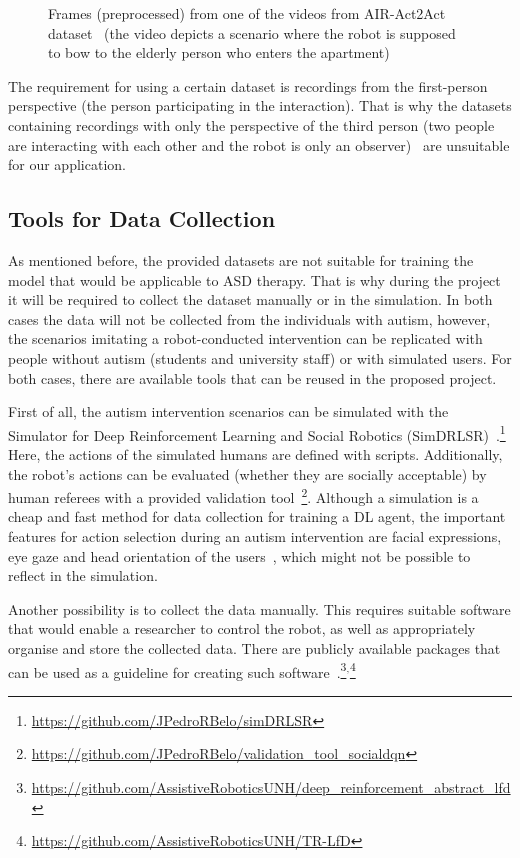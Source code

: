 \documentclass[thesis]{mas_proposal}
\begin{document}
\begin{figure}[htb!]
\begin{subfigure}[b]{0.22\textwidth}
		\subcaption{}%
		\label{subfig:right}
	\end{subfigure}
	\caption{Frames (preprocessed) from one of the videos from AIR-Act2Act dataset~\cite{Ko2021} (the video depicts a scenario where the robot is supposed to bow to the elderly person who enters the apartment)}
	\label{fig:hoora}
\end{figure}

The requirement for using a certain dataset is recordings from the first-person perspective (the person participating in the interaction). That is why the datasets containing recordings with only the perspective of the third person (two people are interacting with each other and the robot is only an observer)~\cite{Hu2013,UT-Interaction-Data,Gemeren2016,Yun2012} are unsuitable for our application.

\subsection{Tools for Data Collection}

As mentioned before, the provided datasets are not suitable for training the model that would be applicable to ASD therapy. That is why during the project it will be required to collect the dataset manually or in the simulation. In both cases the data will not be collected from the individuals with autism, however, the scenarios imitating a robot-conducted intervention can be replicated with people without autism (students and university staff) or with simulated users. For both cases, there are available tools that can be reused in the proposed project.

First of all, the autism intervention scenarios can be simulated with the Simulator for Deep Reinforcement Learning and Social Robotics (SimDRLSR)~\cite{Belo2021}.\footnote{\url{https://github.com/JPedroRBelo/simDRLSR}} Here, the actions of the simulated humans are defined with scripts. Additionally, the robot's actions can be evaluated (whether they are socially acceptable) by human referees with a provided validation tool~\cite{Belo2022}\footnote{\url{https://github.com/JPedroRBelo/validation_tool_socialdqn}}. Although a simulation is a cheap and fast method for data collection for training a DL agent, the important features for action selection during an autism intervention are facial expressions, eye gaze and head orientation of the users~\cite{stolarz2022learningbased}, which might not be possible to reflect in the simulation.

Another possibility is to collect the data manually. This requires suitable software that would enable a researcher to control the robot, as well as appropriately organise and store the collected data. There are publicly available packages that can be used as a guideline for creating such software~\cite{Turner2018,carpio2018learning,carpio2019learning}.\footnote{\url{https://github.com/AssistiveRoboticsUNH/deep_reinforcement_abstract_lfd}}$^,$\footnote{\url{https://github.com/AssistiveRoboticsUNH/TR-LfD}}
\end{document}
